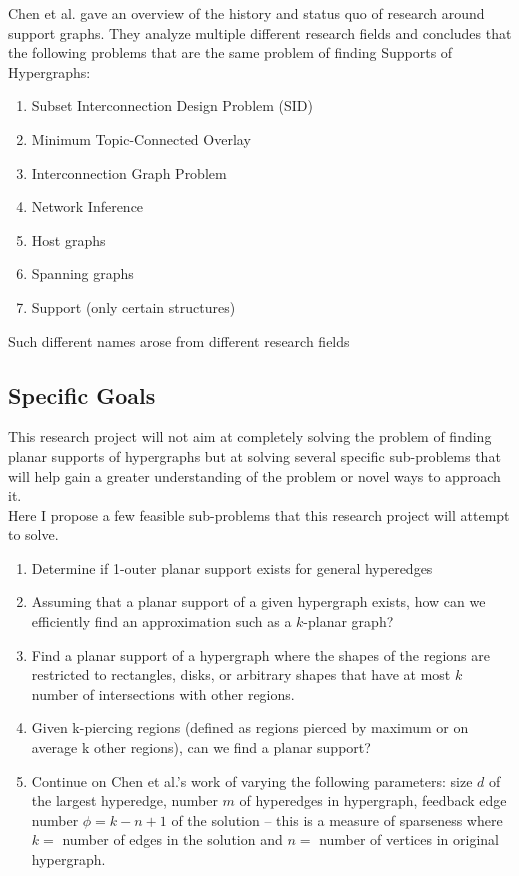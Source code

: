 \documentclass{NSF}
\begin{document}
Chen et al. \cite{Chen2015} gave an overview of the history and status quo of research around support graphs. They analyze multiple different research fields and concludes that the following problems that are the same problem of finding Supports of Hypergraphs:
\begin{enumerate}
\item Subset Interconnection Design Problem (SID)
\item Minimum Topic-Connected Overlay
\item Interconnection Graph Problem
\item Network Inference
\item Host graphs
\item Spanning graphs
\item Support (only certain structures)
\end{enumerate}
Such different names arose from different research fields  \cite{Chen2015}


\subsection{Specific Goals}

This research project will not aim at completely solving the problem of finding planar supports of hypergraphs but at solving several specific sub-problems that will help gain a greater understanding of the problem or novel ways to approach it.\\

Here I propose a few feasible sub-problems that this research project will attempt to solve.
\begin{enumerate}
\item Determine if 1-outer planar support exists for general hyperedges
\item Assuming that a planar support of a given hypergraph exists, how can we efficiently find an approximation such as a $k$-planar graph? 
\item Find a planar support of a hypergraph where the shapes of the regions are restricted to rectangles, disks, or arbitrary shapes that have at most $k$ number of intersections with other regions.
\item Given k-piercing regions (defined as regions pierced by maximum or on average k other regions), can we find a planar support?
\item Continue on Chen et al.'s work of varying the following parameters: 
size $d$ of the largest hyperedge, 
number $m$ of hyperedges in hypergraph,
feedback edge number $\phi = k-n+1$ of the solution -- this is a measure of sparseness where $k=$ number of edges in the solution and $n=$ number of vertices in original hypergraph.
\end{enumerate}
\end{document}
